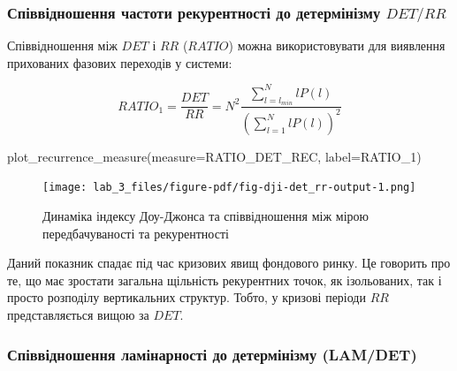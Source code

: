 \documentclass[
  letterpaper,
]{report}
\newenvironment{Shaded}{\begin{snugshade}}{\end{snugshade}}
\newcommand{\NormalTok}[1]{\textcolor[rgb]{0.00,0.23,0.31}{#1}}
\newcommand{\OperatorTok}[1]{\textcolor[rgb]{0.37,0.37,0.37}{#1}}
\newcommand{\StringTok}[1]{\textcolor[rgb]{0.13,0.47,0.30}{#1}}
\begin{document}
\hypertarget{ux441ux43fux456ux432ux432ux456ux434ux43dux43eux448ux435ux43dux43dux44f-ux447ux430ux441ux442ux43eux442ux438-ux440ux435ux43aux443ux440ux435ux43dux442ux43dux43eux441ux442ux456-ux434ux43e-ux434ux435ux442ux435ux440ux43cux456ux43dux456ux437ux43cux443-detrr}{%
\subsubsection{\texorpdfstring{Співвідношення частоти рекурентності до
детермінізму
\(DET/RR\)}{Співвідношення частоти рекурентності до детермінізму DET/RR}}\label{ux441ux43fux456ux432ux432ux456ux434ux43dux43eux448ux435ux43dux43dux44f-ux447ux430ux441ux442ux43eux442ux438-ux440ux435ux43aux443ux440ux435ux43dux442ux43dux43eux441ux442ux456-ux434ux43e-ux434ux435ux442ux435ux440ux43cux456ux43dux456ux437ux43cux443-detrr}}

Співвідношення між \(DET\) і \(RR\) (\(RATIO\)) можна використовувати
для виявлення прихованих фазових переходів у системи:

\[
RATIO_1=\frac{DET}{RR}=N^2\frac{\displaystyle\sum_{l=l_{min}}^{N}lP(l)}{\left(\displaystyle\sum_{l=1}^{N}lP(l)\right)^2}
\]

\begin{Shaded}
\begin{Highlighting}[]
\NormalTok{plot\_recurrence\_measure(measure}\OperatorTok{=}\NormalTok{RATIO\_DET\_REC, label}\OperatorTok{=}\StringTok{\textquotesingle{}RATIO\_1\textquotesingle{}}\NormalTok{)}
\end{Highlighting}
\end{Shaded}

\begin{figure}[H]

{\centering \texttt{[image: lab\_3\_files/figure-pdf/fig-dji-det\_rr-output-1.png]}

}

\caption{\label{fig-dji-det_rr}Динаміка індексу Доу-Джонса та
співвідношення між мірою передбачуваності та рекурентності}

\end{figure}

Даний показник спадає під час кризових явищ фондового ринку. Це говорить
про те, що має зростати загальна щільність рекурентних точок, як
ізольованих, так і просто розподілу вертикальних структур. Тобто, у
кризові періоди \(RR\) представляється вищою за \(DET\).

\hypertarget{ux441ux43fux456ux432ux432ux456ux434ux43dux43eux448ux435ux43dux43dux44f-ux43bux430ux43cux456ux43dux430ux440ux43dux43eux441ux442ux456-ux434ux43e-ux434ux435ux442ux435ux440ux43cux456ux43dux456ux437ux43cux443-lamdet}{%
\subsubsection{Співвідношення ламінарності до детермінізму
(LAM/DET)}\label{ux441ux43fux456ux432ux432ux456ux434ux43dux43eux448ux435ux43dux43dux44f-ux43bux430ux43cux456ux43dux430ux440ux43dux43eux441ux442ux456-ux434ux43e-ux434ux435ux442ux435ux440ux43cux456ux43dux456ux437ux43cux443-lamdet}}
\end{document}
